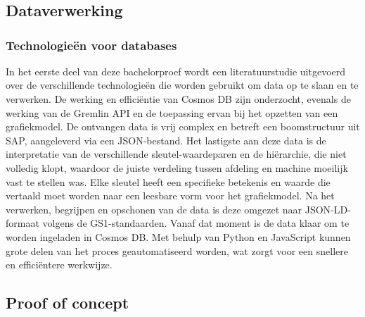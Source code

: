 
\chapter{}%
\label{ch:methodologie}
\section{Dataverwerking}
\subsection{Technologieën voor databases}
In het eerste deel van deze bachelorproef wordt een literatuurstudie uitgevoerd over de verschillende technologieën die worden gebruikt om data op te slaan en te verwerken.
De werking en efficiëntie van Cosmos DB zijn onderzocht, evenals de werking van de Gremlin API en de toepassing ervan bij het opzetten van een grafiekmodel.
De ontvangen data is vrij complex en betreft een boomstructuur uit SAP, aangeleverd via een JSON-bestand.
Het lastigste aan deze data is de interpretatie van de verschillende sleutel-waardeparen en de hiërarchie, die niet volledig klopt, waardoor de juiste verdeling tussen afdeling en machine moeilijk vast te stellen was.
Elke sleutel heeft een specifieke betekenis en waarde die vertaald moet worden naar een leesbare vorm voor het grafiekmodel.
Na het verwerken, begrijpen en opschonen van de data is deze omgezet naar JSON-LD-formaat volgens de GS1-standaarden.
Vanaf dat moment is de data klaar om te worden ingeladen in Cosmos DB.\@
Met behulp van Python en JavaScript kunnen grote delen van het proces geautomatiseerd worden, wat zorgt voor een snellere en efficiëntere werkwijze.

\section{Proof of concept}
